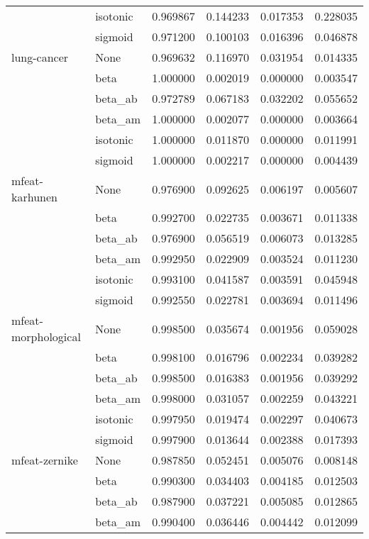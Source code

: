 \begin{tabular}{llrrrr}
        & isotonic &  0.969867 &  0.144233 &  0.017353 &  0.228035 \\
        & sigmoid &  0.971200 &  0.100103 &  0.016396 &  0.046878 \\
lung-cancer & None &  0.969632 &  0.116970 &  0.031954 &  0.014335 \\
        & beta &  1.000000 &  0.002019 &  0.000000 &  0.003547 \\
        & beta\_ab &  0.972789 &  0.067183 &  0.032202 &  0.055652 \\
        & beta\_am &  1.000000 &  0.002077 &  0.000000 &  0.003664 \\
        & isotonic &  1.000000 &  0.011870 &  0.000000 &  0.011991 \\
        & sigmoid &  1.000000 &  0.002217 &  0.000000 &  0.004439 \\
mfeat-karhunen & None &  0.976900 &  0.092625 &  0.006197 &  0.005607 \\
        & beta &  0.992700 &  0.022735 &  0.003671 &  0.011338 \\
        & beta\_ab &  0.976900 &  0.056519 &  0.006073 &  0.013285 \\
        & beta\_am &  0.992950 &  0.022909 &  0.003524 &  0.011230 \\
        & isotonic &  0.993100 &  0.041587 &  0.003591 &  0.045948 \\
        & sigmoid &  0.992550 &  0.022781 &  0.003694 &  0.011496 \\
mfeat-morphological & None &  0.998500 &  0.035674 &  0.001956 &  0.059028 \\
        & beta &  0.998100 &  0.016796 &  0.002234 &  0.039282 \\
        & beta\_ab &  0.998500 &  0.016383 &  0.001956 &  0.039292 \\
        & beta\_am &  0.998000 &  0.031057 &  0.002259 &  0.043221 \\
        & isotonic &  0.997950 &  0.019474 &  0.002297 &  0.040673 \\
        & sigmoid &  0.997900 &  0.013644 &  0.002388 &  0.017393 \\
mfeat-zernike & None &  0.987850 &  0.052451 &  0.005076 &  0.008148 \\
        & beta &  0.990300 &  0.034403 &  0.004185 &  0.012503 \\
        & beta\_ab &  0.987900 &  0.037221 &  0.005085 &  0.012865 \\
        & beta\_am &  0.990400 &  0.036446 &  0.004442 &  0.012099 \\

\end{tabular}
